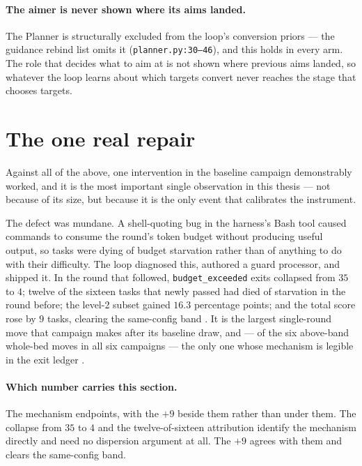 \paragraph{The aimer is never shown where its aims landed.} The Planner
is structurally excluded from the loop's conversion priors --- the
guidance rebind list omits it (\texttt{planner.py:30--46}), and this
holds in every arm. The role that decides what to aim at is not shown
where previous aims landed, so whatever the loop learns about which
targets convert never reaches the stage that chooses targets.

\section{The one real repair}
\label{sec:one-repair}

Against all of the above, one intervention in the baseline campaign
demonstrably worked, and it is the most important single observation in
this thesis --- not because of its size, but because it is the only event
that calibrates the instrument.

The defect was mundane. A shell-quoting bug in the harness's Bash tool
caused commands to consume the round's token budget without producing
useful output, so tasks were dying of budget starvation rather than of
anything to do with their difficulty. The loop diagnosed this, authored a
guard processor, and shipped it. In the round that followed,
\texttt{budget\_exceeded} exits collapsed from $35$ to $4$; twelve of the
sixteen tasks that newly passed had died of starvation in the round before;
the level-2 subset gained $16.3$ percentage points; and the total score
rose by $9$ tasks, clearing the same-config band . It is the largest
single-round move that campaign makes after its baseline draw, and --- of
the six above-band whole-bed moves in all six campaigns --- the only one
whose mechanism is legible in the exit ledger .

\paragraph{Which number carries this section.} The mechanism endpoints,
with the $+9$ beside them rather than under them. The collapse from $35$ to
$4$ and the twelve-of-sixteen attribution identify the mechanism directly
and need no dispersion argument at all. The $+9$ agrees with them and
clears the same-config band.

